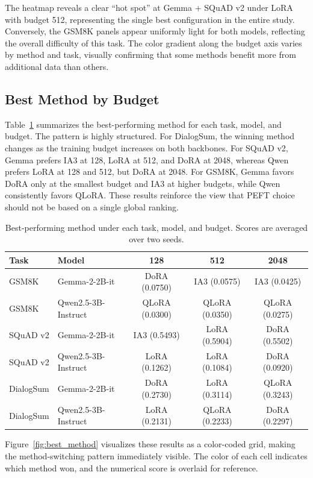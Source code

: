 \documentclass{article}
\begin{document}
The heatmap reveals a clear ``hot spot'' at Gemma + SQuAD v2 under LoRA with budget 512, representing the single best configuration in the entire study. Conversely, the GSM8K panels appear uniformly light for both models, reflecting the overall difficulty of this task. The color gradient along the budget axis varies by method and task, visually confirming that some methods benefit more from additional data than others.

\subsection{Best Method by Budget}

Table~\ref{tab:best} summarizes the best-performing method for each task, model, and budget. The pattern is highly structured. For DialogSum, the winning method changes as the training budget increases on both backbones. For SQuAD v2, Gemma prefers IA3 at 128, LoRA at 512, and DoRA at 2048, whereas Qwen prefers LoRA at 128 and 512, but DoRA at 2048. For GSM8K, Gemma favors DoRA only at the smallest budget and IA3 at higher budgets, while Qwen consistently favors QLoRA. These results reinforce the view that PEFT choice should not be based on a single global ranking.

\begin{table}[H]
\centering
\small
\caption{Best-performing method under each task, model, and budget. Scores are averaged over two seeds.}
\label{tab:best}
\begin{tabular}{llccc}
\toprule
Task & Model & 128 & 512 & 2048 \\
\midrule
GSM8K & Gemma-2-2B-it & DoRA (0.0750) & IA3 (0.0575) & IA3 (0.0425) \\
GSM8K & Qwen2.5-3B-Instruct & QLoRA (0.0300) & QLoRA (0.0350) & QLoRA (0.0275) \\
\midrule
SQuAD v2 & Gemma-2-2B-it & IA3 (0.5493) & LoRA (0.5904) & DoRA (0.5502) \\
SQuAD v2 & Qwen2.5-3B-Instruct & LoRA (0.1262) & LoRA (0.1084) & DoRA (0.0920) \\
\midrule
DialogSum & Gemma-2-2B-it & DoRA (0.2730) & LoRA (0.3114) & QLoRA (0.3243) \\
DialogSum & Qwen2.5-3B-Instruct & LoRA (0.2131) & QLoRA (0.2233) & DoRA (0.2297) \\
\bottomrule
\end{tabular}
\end{table}

Figure~\ref{fig:best_method} visualizes these results as a color-coded grid, making the method-switching pattern immediately visible. The color of each cell indicates which method won, and the numerical score is overlaid for reference.
\end{document}
